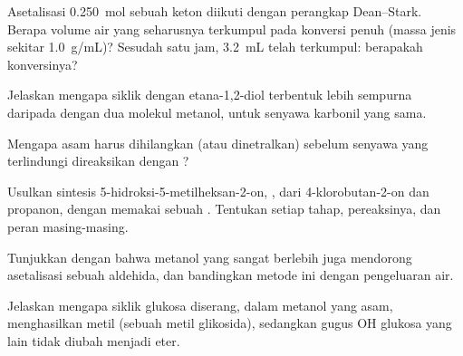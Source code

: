 \begin{exercise}[$\star\star$]\label{exo:b1:acetals-protection:7}
Asetalisasi \qty{0.250}{mol} sebuah keton diikuti dengan perangkap
Dean--Stark. Berapa volume air yang seharusnya terkumpul pada konversi
penuh (massa jenis sekitar \qty{1.0}{g/mL})? Sesudah satu jam,
\qty{3.2}{mL} telah terkumpul: berapakah konversinya?
\end{exercise}

\begin{exercise}[$\star\star$]\label{exo:b1:acetals-protection:8}
Jelaskan mengapa  siklik dengan etana-1,2-diol terbentuk lebih
sempurna daripada  dengan dua molekul metanol, untuk senyawa
karbonil yang sama.
\end{exercise}

\begin{exercise}[$\star\star$]\label{exo:b1:acetals-protection:9}
Mengapa  asam harus dihilangkan (atau dinetralkan) sebelum senyawa
yang terlindungi direaksikan dengan ?
\end{exercise}

\begin{exercise}[$\star\star\star$]\label{exo:b1:acetals-protection:10}
Usulkan sintesis 5-hidroksi-5-metilheksan-2-on,
, dari 4-klorobutan-2-on dan propanon, dengan
memakai sebuah . Tentukan setiap tahap, pereaksinya, dan peran
masing-masing.
\end{exercise}

\begin{exercise}[$\star\star\star$]\label{exo:b1:acetals-protection:11}
Tunjukkan dengan  bahwa metanol yang sangat berlebih juga
mendorong asetalisasi sebuah aldehida, dan bandingkan metode ini dengan
pengeluaran air.
\end{exercise}

\begin{exercise}[$\star\star\star$]\label{exo:b1:acetals-protection:12}
Jelaskan mengapa  siklik glukosa diserang, dalam metanol yang
asam, menghasilkan metil  (sebuah metil glikosida), sedangkan gugus
OH glukosa yang lain tidak diubah menjadi eter.
\end{exercise}

